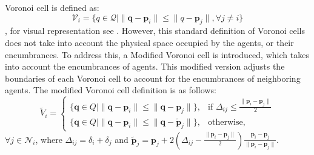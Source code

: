         Voronoi cell is defined as: 
        \begin{equation}
            \mathcal{V}_i = \{q \in \mathcal{Q} \lvert \lVert \mathbf{q} - \mathbf{p}_i \rVert \leq \lVert q - \mathbf{p}_j \rVert, \forall j \neq i\}
        \end{equation},
        for visual representation see . 
        However, this standard definition of Voronoi cells does not take into account the physical space occupied by the agents, or their encumbrances. 
        To address this, a Modified Voronoi cell is introduced, which takes into account the encumbrances of agents.
        This modified version adjusts the boundaries of each Voronoi cell to account for the encumbrances of neighboring agents.
        The modified Voronoi cell definition is as follows:
        \begin{equation}
            \tilde{V}_i = 
            \begin{cases}
            \{ \mathbf{q} \in Q \mid \| \mathbf{q} - \mathbf{p}_i \| \leq \| \mathbf{q} - \mathbf{p}_j \| \}, & \text{if } \Delta_{ij} \leq \frac{\| \mathbf{p}_i - \mathbf{p}_j \|}{2} \\
            \{ \mathbf{q} \in Q \mid \| \mathbf{q} - \mathbf{p}_i \| \leq \| \mathbf{q} - \tilde{\mathbf{p}}_j \| \}, & \text{otherwise},
            \end{cases}
        \end{equation}
        $\forall j \in \mathcal{N}_i$, where $\Delta_{ij} = \delta_i + \delta_j$ and $\tilde{\mathbf{p}}_j = \mathbf{p}_j + 2(\Delta_{ij} - \frac{\| \mathbf{p}_i - \mathbf{p}_j \|}{2})\frac{ \mathbf{p}_i - \mathbf{p}_j }{\| \mathbf{p}_i - \mathbf{p}_j \|}$.

